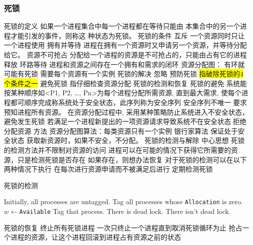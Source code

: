 \documentclass{ctexart}
\newcommand{\hl}[1]{\colorbox{yellow}{#1}}
\begin{document}
\subsubsection{死锁}
\begin{outline}
    \1 死锁的定义
        \2  如果一个进程集合中每一个进程都在等待只能由 本集合中的另一个进程才能引发的事件，则称这 种状态为死锁。
    \1 死锁的条件
        \2 互斥
            \3 一个资源同时只让一个进程使用
        \2拥有并等待
            \3 进程在拥有一个资源时又申请另一个资源，并等待分配给它。
        \2 资源不可抢占
            \3 分配给一个进程的资源是不可抢占的，只能由占有它的进程释放
        \2 环路等待
            \3 进程和资源之间存在一个拥有和需求的闭环
    \1 资源分配图：
        \2 有环就可能有死锁
        \2 需要每个资源有一个实例
    \1 死锁的解决
        \2 忽略
        \2 预防死锁
            \3 \hl{指破除死锁的4个条件之一}
        \2 避免死锁
            \3 指仔细检查资源分配
        \2 死锁的检测和恢复
    \1 死锁的避免
    系统能按某种顺序如<P1, P2, …, Pn>为每个进程分配所需资源,
    直到最大需求, 使每个进程都可顺序完成称系统处于安全状态，此序列称为安全序列
        \2 安全序列不唯一
        \2 要求预知进程所有资源。
            \3 在资源分配过程中, 采用某种策略防止系统进入不安全状态，避免发生死锁
            \3 若满足一个进程新提出的一项资源请求导致系统不在安全状态拒绝分配资源
            \3 方法
                \4 资源分配图算法：每类资源只有一个实例
                \4 银行家算法
                    \4 保证处于安全状态
                    \4 获取新资源时，如果不安全，不分配。
    \1 死锁的检测与解除
        \2 中心思想
            \3死锁的检测方法并不限制对资源的访问
            \3进程可以在可能的情况下获得它所需要的资源，只是检测死锁是否存在
            \3如果存在，则想办法恢复
        \2对于死锁的检测可以在以下两种情况下执行
            \3在每次进行资源申请而不被满足后进行
            \3定期检测死锁
            \begin{algorithm}[H]
                \caption{死锁的检测}
                \begin{algorithmic}[1]
                    \State Initially, all processes are untagged.
                    \State Tag all processes whose \verb|Allocation| is zero.
                    \State $w \gets $\verb|Available|
                        \State Tag that process.
                    \EndWhile
                        \State There is dead lock.
                    \Else
                        \State There isn't dead lock.
                    \EndIf
                \end{algorithmic}
            \end{algorithm}
        \2 死锁的恢复
            \3 终止所有死锁进程
            \3 一次只终止一个进程直到取消死锁循环为止
            \3 抢占一个进程的资源，让这个进程回滚到进程占有资源之前的状态
        

\end{outline}
\end{document}
